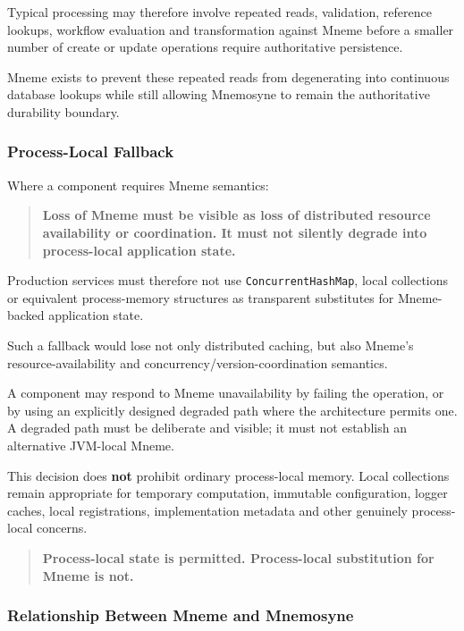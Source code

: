 Typical processing may therefore involve repeated reads, validation, reference lookups, workflow evaluation and transformation against Mneme before a smaller number of create or update operations require authoritative persistence.

Mneme exists to prevent these repeated reads from degenerating into continuous database lookups while still allowing Mnemosyne to remain the authoritative durability boundary.

\subsubsection{Process-Local Fallback}

Where a component requires Mneme semantics:

\begin{quote}
    \textbf{Loss of Mneme must be visible as loss of distributed resource availability or coordination. It must not silently degrade into process-local application state.}
\end{quote}

Production services must therefore not use \texttt{ConcurrentHashMap}, local collections or equivalent process-memory structures as transparent substitutes for Mneme-backed application state.

Such a fallback would lose not only distributed caching, but also Mneme's resource-availability and concurrency/version-coordination semantics.

A component may respond to Mneme unavailability by failing the operation, or by using an explicitly designed degraded path where the architecture permits one. A degraded path must be deliberate and visible; it must not establish an alternative JVM-local Mneme.

This decision does \textbf{not} prohibit ordinary process-local memory. Local collections remain appropriate for temporary computation, immutable configuration, logger caches, local registrations, implementation metadata and other genuinely process-local concerns.

\begin{quote}
    \textbf{Process-local state is permitted. Process-local substitution for Mneme is not.}
\end{quote}

\subsubsection{Relationship Between Mneme and Mnemosyne}

